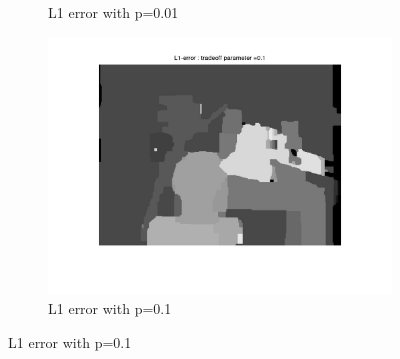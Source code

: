 \documentclass[fleqn]{article}
\begin{document}
\begin{figure}[!ht]
\begin{subfigure}{0.5\textwidth}
\caption{L1 error with p=0.01}
\end{subfigure}
 \begin{subfigure}{0.5\textwidth}
\includegraphics[scale=0.2]{./pics/tsukuba_L1_error_p=0.1.jpg}
\caption{L1 error with p=0.1}
\end{subfigure}
\end{figure}
\end{document}
